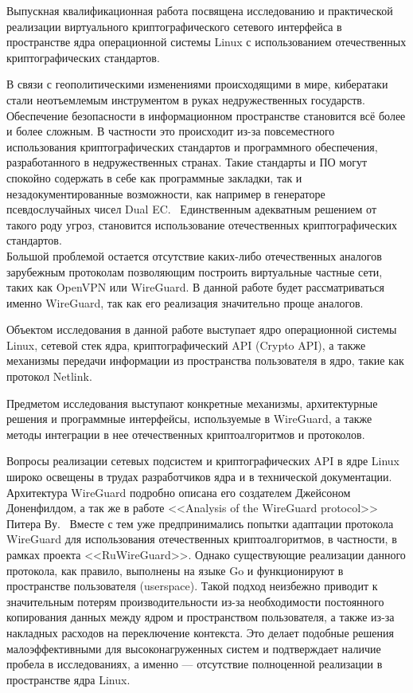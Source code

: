 Выпускная квалификационная работа посвящена исследованию и практической реализации виртуального криптографического сетевого интерфейса в пространстве ядра операционной системы Linux с использованием отечественных криптографических стандартов.

В связи с геополитическими изменениями происходящими в мире, кибератаки стали неотъемлемым инструментом в руках недружественных государств.
Обеспечение безопасности в информационном пространстве становится всё более и более сложным.
В частности это происходит из-за повсеместного использования криптографических стандартов и программного обеспечения, разработанного в недружественных странах.
Такие стандарты и ПО могут спокойно содержать в себе как программные закладки, так и незадокументированные возможности, как например в генераторе псевдослучайных чисел Dual EC.~\cite{dual_ec_backdoor}
Единственным адекватным решением от такого роду угроз, становится использование отечественных криптографических стандартов.\\

Большой проблемой остается отсутствие каких-либо отечественных аналогов зарубежным протоколам позволяющим построить виртуальные частные сети, таких как OpenVPN или WireGuard.
В данной работе будет рассматриваться именно WireGuard, так как его реализация значительно проще аналогов.

Объектом исследования в данной работе выступает ядро операционной системы Linux, сетевой стек ядра, криптографический API (Crypto API), а также механизмы передачи информации из пространства пользователя в ядро, такие как протокол Netlink.

Предметом исследования выступают конкретные механизмы, архитектурные решения и программные интерфейсы, используемые в WireGuard, а также методы интеграции в нее отечественных криптоалгоритмов и протоколов.

Вопросы реализации сетевых подсистем и криптографических API в ядре Linux широко освещены в трудах разработчиков ядра и в технической документации.
Архитектура WireGuard подробно описана его создателем Джейсоном Доненфилдом, а так же в работе <<Analysis of the WireGuard
protocol>> Питера Ву.~\cite{wireguard_analysis}
Вместе с тем уже предпринимались попытки адаптации протокола WireGuard для использования отечественных криптоалгоритмов, в частности, в рамках проекта <<RuWireGuard>>.
Однако существующие реализации данного протокола, как правило, выполнены на языке Go и функционируют в пространстве пользователя (userspace).
Такой подход неизбежно приводит к значительным потерям производительности из-за необходимости постоянного копирования данных между ядром и пространством пользователя, а также из-за накладных расходов на переключение контекста.
Это делает подобные решения малоэффективными для высоконагруженных систем и подтверждает наличие пробела в исследованиях, а именно — отсутствие полноценной реализации в пространстве ядра Linux.

